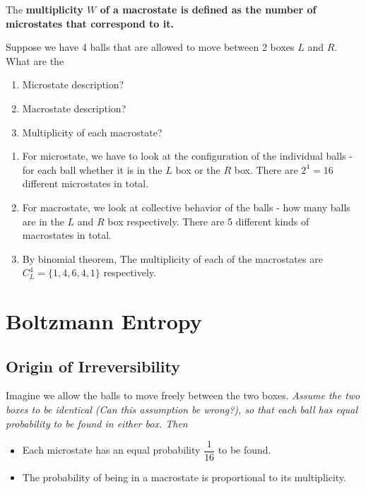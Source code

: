 \documentclass[class=article, crop=false, 12pt]{standalone}
\begin{document}
The \bf{multiplicity $W$ of a macrostate} is defined as the number of microstates that correspond to it. 






\begin{example}
    Suppose we have 4 balls that are allowed to move between 2 boxes $L$ and $R$. What are the 
    \begin{enumerate}
        \item Microstate description?
        \item Macrostate description?
        \item Multiplicity of each macrostate?
    \end{enumerate}


    \begin{enumerate}
        \item For microstate, 
        we have to look at the configuration of the individual balls - 
        for each ball whether it is in the $L$ box or the $R$ box. 
        There are $2^4=16$ different microstates in total.

        \item For macrostate, we look at collective behavior of the balls - 
        how many balls are in the $L$ and $R$ box respectively. 
        There are 5 different kinds of macrostates in total.

        \item By binomial theorem, 
        The multiplicity of each of the macrostates are $C^4_L = \{1,4,6,4,1\}$ respectively. 

    \end{enumerate}
\end{example}



\linesep
\section{Boltzmann Entropy}

\subsection{Origin of Irreversibility}

Imagine we allow the balls to move freely between the two boxes. 
\it{Assume} the two boxes to be identical (Can this assumption be wrong?), 
so that each ball has equal probability to be found in either box. 
Then
\begin{itemize}
    \item Each microstate has an equal probability $\dfrac{1}{16}$ to be found.
    \item The probability of being in a macrostate is proportional to its multiplicity. 
    
\end{itemize}
\end{document}
